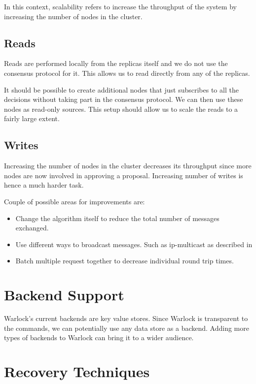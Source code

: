 In this context, scalability refers to increase the throughput of the system
by increasing the number of nodes in the cluster.

\subsection{Reads}

Reads are performed locally from the replicas itself and we do not use the
consensus protocol for it. This allows us to read directly from any of the
replicas.

It should be possible to create additional nodes that just subscribes to all
the decisions without taking part in the consensus protocol. We can then use
these nodes as read-only sources. This setup should allow us to scale the reads
to a fairly large extent.

\subsection{Writes}

Increasing the number of nodes in the cluster decreases its throughput since
more nodes are now involved in approving a proposal. Increasing number of writes
is hence a much harder task.

Couple of possible areas for improvements are:

\begin{itemize}
  \item Change the algorithm itself to reduce the total number of messages
    exchanged.
  \item Use different ways to broadcast messages. Such as ip-multicast as
    described in \citet{MarandiPSP10}
  \item Batch multiple request together to decrease individual round trip times.
\end{itemize}

\section{Backend Support}

Warlock's current backends are key value stores. Since Warlock is transparent
to the commands, we can potentially use any data store as a backend. Adding
more types of backends to Warlock can bring it to a wider audience.

\section{Recovery Techniques}

